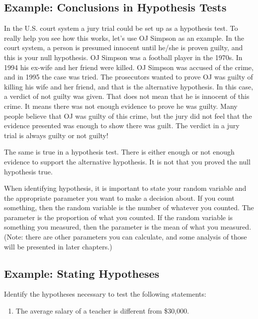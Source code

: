 \documentclass[
]{book}
\providecommand{\tightlist}{%
  \setlength{\itemsep}{0pt}\setlength{\parskip}{0pt}}
\begin{document}
\hypertarget{example-conclusions-in-hypothesis-tests}{%
\subsection{Example: Conclusions in Hypothesis Tests}\label{example-conclusions-in-hypothesis-tests}}

In the U.S. court system a jury trial could be set up as a hypothesis test. To really help you see how this works, let's use OJ Simpson as an example. In the court system, a person is presumed innocent until he/she is proven guilty, and this is your null hypothesis. OJ Simpson was a football player in the 1970s. In 1994 his ex-wife and her friend were killed. OJ Simpson was accused of the crime, and in 1995 the case was tried. The prosecutors wanted to prove OJ was guilty of killing his wife and her friend, and that is the alternative hypothesis.
In this case, a verdict of not guilty was given. That does not mean that he is innocent of this crime. It means there was not enough evidence to prove he was guilty. Many people believe that OJ was guilty of this crime, but the jury did not feel that the evidence presented was enough to show there was guilt. The verdict in a jury trial is always guilty or not guilty!

The same is true in a hypothesis test. There is either enough or not enough evidence to support the alternative hypothesis. It is not that you proved the null hypothesis true.

When identifying hypothesis, it is important to state your random variable and the appropriate parameter you want to make a decision about. If you count something, then the random variable is the number of whatever you counted. The parameter is the proportion of what you counted. If the random variable is something you measured, then the parameter is the mean of what you measured. (Note: there are other parameters you can calculate, and some analysis of those will be presented in later chapters.)

\hypertarget{example-stating-hypotheses}{%
\subsection{Example: Stating Hypotheses}\label{example-stating-hypotheses}}

Identify the hypotheses necessary to test the following statements:

\begin{enumerate}
\def\labelenumi{\alph{enumi}.}
\tightlist
\item
  The average salary of a teacher is different from \$30,000.
\end{enumerate}
\end{document}
